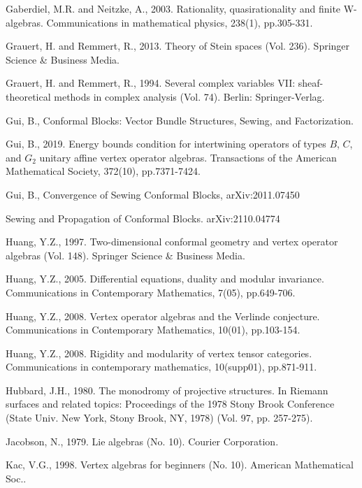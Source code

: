 \documentclass[12pt,a4paper,notitlepage]{article}
\theoremstyle{definition}
\theoremstyle{plain}
\numberwithin{equation}{section}
\begin{document}
\begin{thebibliography}{999999}
Gaberdiel, M.R. and Neitzke, A., 2003. Rationality, quasirationality and finite W-algebras. Communications in mathematical physics, 238(1), pp.305-331.



Grauert, H. and Remmert, R., 2013. Theory of Stein spaces (Vol. 236). Springer Science \& Business Media.

Grauert, H. and Remmert, R., 1994. Several complex variables VII: sheaf-theoretical methods in complex analysis (Vol. 74). Berlin: Springer-Verlag.

Gui, B., Conformal Blocks: Vector Bundle Structures, Sewing, and Factorization.

Gui, B., 2019. Energy bounds condition for intertwining operators of types $B$, $C$, and $G_2$ unitary affine vertex operator algebras. Transactions of the American Mathematical Society, 372(10), pp.7371-7424.

Gui, B., Convergence of Sewing Conformal Blocks,  arXiv:2011.07450

Sewing and Propagation of Conformal Blocks. arXiv:2110.04774

Huang, Y.Z., 1997. Two-dimensional conformal geometry and vertex operator algebras (Vol. 148). Springer Science \& Business Media.

Huang, Y.Z., 2005. Differential equations, duality and modular invariance. Communications in Contemporary Mathematics, 7(05), pp.649-706.
	
Huang, Y.Z., 2008. Vertex operator algebras and the Verlinde conjecture. Communications in Contemporary Mathematics, 10(01), pp.103-154.
	
	
Huang, Y.Z., 2008. Rigidity and modularity of vertex tensor categories. Communications in contemporary mathematics, 10(supp01), pp.871-911.

Hubbard, J.H., 1980. The monodromy of projective structures. In Riemann surfaces and related topics: Proceedings of the 1978 Stony Brook Conference (State Univ. New York, Stony Brook, NY, 1978) (Vol. 97, pp. 257-275).

Jacobson, N., 1979. Lie algebras (No. 10). Courier Corporation.

Kac, V.G., 1998. Vertex algebras for beginners (No. 10). American Mathematical Soc..



\end{thebibliography}
\end{document}
